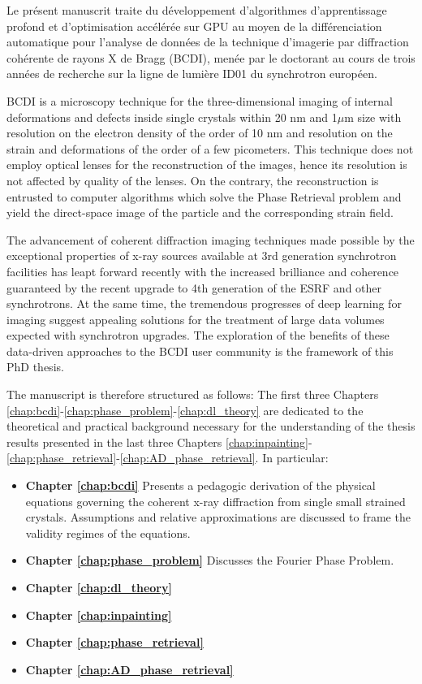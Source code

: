 Le présent manuscrit traite du développement d'algorithmes d'apprentissage profond et d'optimisation accélérée sur 
GPU au moyen de la différenciation automatique pour l'analyse de données de la technique d'imagerie par diffraction 
cohérente de rayons X de Bragg (BCDI), menée par le doctorant au cours de trois années de recherche sur la ligne de lumière 
ID01 du synchrotron européen.

BCDI is a microscopy technique for the three-dimensional imaging of internal deformations and defects inside single 
crystals within 20 nm and 1$\mu$m size with resolution on the electron density of the order of 10 nm and resolution on 
the strain and deformations of the order of a few picometers. 
This technique does not employ optical lenses for the reconstruction of the images, hence its resolution is not affected 
by quality of the lenses. On the contrary, the reconstruction is entrusted to computer algorithms which solve the 
Phase Retrieval problem and yield the direct-space image of the particle and the corresponding strain field. 

The advancement of coherent diffraction imaging techniques made possible by the exceptional properties of x-ray sources 
available at 3rd generation synchrotron facilities has leapt forward recently with the increased brilliance and coherence 
guaranteed by the recent upgrade to 4th generation of the ESRF and other synchrotrons. At the same time, the tremendous 
progresses of deep learning for imaging suggest appealing solutions for the treatment of large data volumes expected 
with synchrotron upgrades. The exploration of the benefits of these data-driven approaches to the BCDI user community is 
the framework of this PhD thesis. 

The manuscript is therefore structured as follows: The first three Chapters \ref{chap:bcdi}-\ref{chap:phase_problem}-\ref{chap:dl_theory} 
are dedicated to the theoretical and practical background necessary for the understanding of the thesis results presented 
in the last three Chapters \ref{chap:inpainting}-\ref{chap:phase_retrieval}-\ref{chap:AD_phase_retrieval}. In particular: 
\begin{itemize}

  \item \textbf{Chapter \ref{chap:bcdi}} Presents a pedagogic derivation of the physical equations governing the coherent 
  x-ray diffraction from single small strained crystals. Assumptions and relative approximations are discussed to frame the validity 
  regimes of the equations. 

  \item \textbf{Chapter \ref{chap:phase_problem}} Discusses the Fourier Phase Problem.
  \item \textbf{Chapter \ref{chap:dl_theory}} 
  \item  \textbf{Chapter \ref{chap:inpainting}} 
  \item \textbf{Chapter \ref{chap:phase_retrieval}} 
  \item \textbf{Chapter \ref{chap:AD_phase_retrieval}} 
\end{itemize}